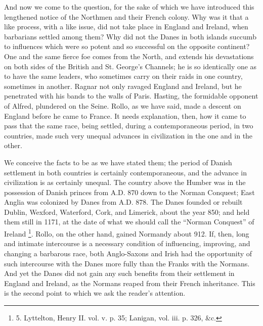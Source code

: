 And now we come to the
question, for the sake of which we have introduced this lengthened
notice of the Northmen and their French colony. Why was it that a like
process, with a like issue, did not take place in England and Ireland,
when barbarians settled among them? Why did not the Danes in both
islands succumb to influences which were so potent and so successful
on the opposite continent? One and the same fierce foe comes from the
North, and extends his devastations on both sides of the British and
St. George's Channels; he is so identically one as to have the same
leaders, who sometimes carry on their raids in one country, sometimes
in another. Ragnar not only ravaged England and Ireland, but he
penetrated with his bands to the walls of Paris. Hasting, the
formidable opponent of Alfred, plundered on the Seine. Rollo, as we
have said, made a descent on England before he came to France. It
needs explanation, then, how it came to pass that the same race, being
settled, during a contemporaneous period, in two countries, made such
very unequal advances in civilization in the one and in the other.

We conceive the facts to be as
we have stated them; the period of Danish settlement in both countries
is certainly contemporaneous, and the advance in civilization is as
certainly unequal. The country above the Humber was in the possession
of Danish princes from A.D.
870 down to the Norman Conquest; East Anglia was colonized by Danes
from A.D. 878. The Danes founded or rebuilt Dublin,
Wexford, Waterford, Cork, and Limerick, about the year 850; and
held them still in 1171, at the date of what we should call the ``Norman
Conquest'' of Ireland \footnote{5.
Lyttelton, Henry II. vol. v. p. 35; Lanigan, vol. iii. p. 326, \&c.}.
Rollo, on the other hand, gained Normandy about 912. If, then, long
and intimate intercourse is a necessary condition of influencing,
improving, and changing a barbarous race, both Anglo-Saxons and Irish
had the opportunity of such intercourse with the Danes more fully than
the Franks with the Normans. And yet the Danes did not gain any such
benefits from their settlement in England and Ireland, as the Normans
reaped from their French inheritance. This is the second point to
which we ask the reader's attention.

